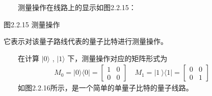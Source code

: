\documentclass[a4paper,11pt,english]{sphinxmanual}
\begin{document}
\sphinxAtStartPar
  测量操作在线路上的显示如图2.2.15：


\begin{center}图2.2.15 测量操作
\end{center}
\sphinxAtStartPar
它表示对该量子路线代表的量子比特进行测量操作。

\sphinxAtStartPar
  在计算 \(|0\rangle\) , \(|1\rangle\) 下，测量操作对应的矩阵形式为
\begin{equation*}
\begin{split}M_{0}=|0\rangle \langle 0|=\left[\begin{array}{ll} 1 & 0 \\ 0 & 0 \end{array}\right] \quad M_{1}=| 1\ \rangle\langle 1|=\left[\begin{array}{ll} 0 & 0 \\ 0 & 1 \end{array}\right]\end{split}
\end{equation*}
\sphinxAtStartPar
  如图2.2.16所示，是一个简单的单量子比特的量子线路。

\end{document}
